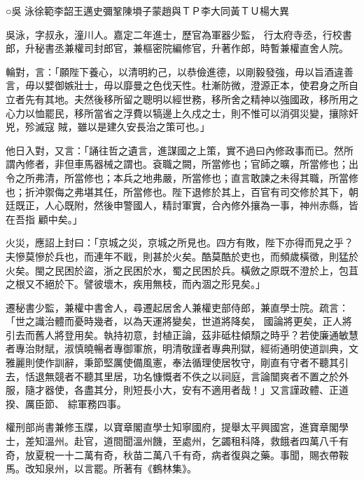 
\begin{pinyinscope}

 ○吳
 泳徐範李韶王邁史彌鞏陳塤子蒙趙與ＴＰ李大同黃ＴＵ楊大異



 吳泳，字叔永，潼川人。嘉定二年進士，歷官為軍器少監，
 行太府寺丞，行校書郎，升秘書丞兼權司封郎官，兼樞密院編修官，升著作郎，時暫兼權直舍人院。



 輪對，言：「願陛下養心，以清明約己，以恭儉進德，以剛毅發強，毋以旨酒違善言，毋以嬖御嫉壯士，毋以靡曼之色伐天性。杜漸防微，澄源正本，使君身之所自立者先有其地。夫然後移所留之聰明以經世務，移所舍之精神以強國政，移所用之心力以恤罷民，移所當省之浮費以犒邊上久戍之士，則不惟可以消弭災變，攘除奸兇，殄滅寇
 賊，雖以是建久安長治之策可也。」



 他日入對，又言：「誦往哲之遺言，進謀國之上策，實不過曰內修政事而已。然所謂內修者，非但車馬器械之謂也。袞職之闕，所當修也；官師之曠，所當修也；出令之所弗清，所當修也；本兵之地弗嚴，所當修也；直言敢諫之未得其職，所當修也；折沖禦侮之弗堪其任，所當修也。陛下退修於其上，百官有司交修於其下，朝廷既正，人心既附，然後申警國人，精討軍實，合內修外攘為一事，神州赤縣，皆在吾指
 顧中矣。」



 火災，應詔上封曰：「京城之災，京城之所見也。四方有敗，陛下亦得而見之乎？夫慘莫慘於兵也，而連年不戢，則甚於火矣。酷莫酷於吏也，而頻歲橫徵，則猛於火矣。閩之民困於盜，浙之民困於水，蜀之民困於兵。橫斂之原既不澄於上，包苴之根又不絕於下。譬彼壞木，疾用無枝，而內涸之形見矣。」



 遷秘書少監，兼權中書舍人，尋遷起居舍人兼權吏部侍郎，兼直學士院。疏言：「世之識治體而憂時幾者，以為天運將變矣，世道將降矣，
 國論將更矣，正人將引去而舊人將登用矣。執持初意，封植正論，茲非砥柱傾頹之時乎？若使廉通敏慧者專治財賦，淑慎曉暢者專御軍旅，明清敬謹者專典刑獄，經術通明使道訓典，文雅麗則使作訓辭，秉節堅厲使備風憲，奉法循理使居牧守，剛直有守者不聽其引去，恬退無競者不聽其里居，功名慷慨者不佚之以祠庭，言論闓爽者不置之於外服，隨才器使，各盡其分，則短長小大，安有不適用者哉！」又言謹政體、正道揆、厲臣節、
 綜軍務四事。



 權刑部尚書兼修玉牒，以寶章閣直學士知寧國府，提舉太平興國宮，進寶章閣學士，差知溫州。赴官，道間聞溫州饑，至處州，乞蠲租科降，救餓者四萬八千有奇，放夏稅一十二萬有奇，秋苗二萬八千有奇，病者復與之藥。事聞，賜衣帶鞍馬。改知泉州，以言罷。所著有《鶴林集》。




\end{pinyinscope}
